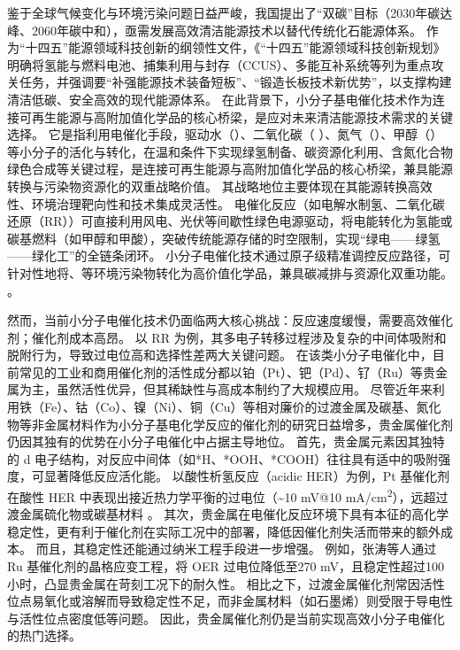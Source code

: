 
鉴于全球气候变化与环境污染问题日益严峻，我国提出了``双碳''目标（2030年碳达峰、2060年碳中和），亟需发展高效清洁能源技术以替代传统化石能源体系\cite{Chen_2024,Xia_2022}。
作为“十四五”能源领域科技创新的纲领性文件，《“十四五”能源领域科技创新规划》明确将氢能与燃料电池、捕集利用与封存（CCUS）、多能互补系统等列为重点攻关任务，并强调要“补强能源技术装备短板”、“锻造长板技术新优势”，以支撑构建清洁低碳、安全高效的现代能源体系\cite{NEA2021EnergyInnovation}。
在此背景下，小分子基电催化技术作为连接可再生能源与高附加值化学品的核心桥梁，是应对未来清洁能源技术需求的关键选择\cite{Zhu_2021}。
它是指利用电催化手段，驱动水（）、二氧化碳（ ）、氮气（）、甲醇（）等小分子的活化与转化，在温和条件下实现绿氢制备、碳资源化利用、含氮化合物绿色合成等关键过程，是连接可再生能源与高附加值化学品的核心桥梁，兼具能源转换与污染物资源化的双重战略价值\cite{Peng_2023,Wang_2022,Zhang_2016,Quan_2021}。
其战略地位主要体现在其能源转换高效性、环境治理靶向性和技术集成灵活性。
电催化反应（如电解水制氢、二氧化碳还原（RR））可直接利用风电、光伏等间歇性绿色电源驱动，将电能转化为氢能或碳基燃料（如甲醇和甲酸），突破传统能源存储的时空限制，实现``绿电——绿氢——绿化工''的全链条闭环\cite{Jiao_2015}。
小分子电催化技术通过原子级精准调控反应路径，可针对性地将、等环境污染物转化为高价值化学品\cite{Liu_2022}，兼具碳减排与资源化双重功能。
。

然而，当前小分子电催化技术仍面临两大核心挑战：反应速度缓慢，需要高效催化剂；催化剂成本高昂。
以 RR 为例，其多电子转移过程涉及复杂的中间体吸附和脱附行为，导致过电位高和选择性差两大关键问题\cite{Liu_2022}。
在该类小分子电催化中，目前常见的工业和商用催化剂的活性成分都以铂（Pt）、钯（Pd）、钌（Ru）等贵金属为主\cite{Du_2019,Nie_2015}，虽然活性优异，但其稀缺性与高成本制约了大规模应用。
尽管近年来利用铁（Fe）、钴（Co）、镍（Ni）、铜（Cu）等相对廉价的过渡金属及碳基、氮化物等非金属材料作为小分子基电化学反应的催化剂的研究日益增多，贵金属催化剂仍因其独有的优势在小分子电催化中占据主导地位。
首先，贵金属元素因其独特的 d 电子结构，对反应中间体（如*H、*OOH、*COOH）往往具有适中的吸附强度，可显著降低反应活化能。
以酸性析氢反应（acidic
HER）为例，Pt 基催化剂在酸性 HER 中表现出接近热力学平衡的过电位（\textasciitilde10
mV@10
mA/cm\textsuperscript{2}），远超过渡金属硫化物或碳基材料\cite{Jiao_2015,Wei_2024} 。
其次，贵金属在电催化反应环境下具有本征的高化学稳定性，更有利于催化剂在实际工况中的部署，降低因催化剂失活而带来的额外成本。
而且，其稳定性还能通过纳米工程手段进一步增强。
例如，张涛等人通过 Ru 基催化剂的晶格应变工程，将 OER 过电位降低至270
mV，且稳定性超过100小时，凸显贵金属在苛刻工况下的耐久性\cite{Hou_2023}。
相比之下，过渡金属催化剂常因活性位点易氧化或溶解而导致稳定性不足，而非金属材料（如石墨烯）则受限于导电性与活性位点密度低等问题\cite{Maiti_2021}。
因此，贵金属催化剂仍是当前实现高效小分子电催化的热门选择。

